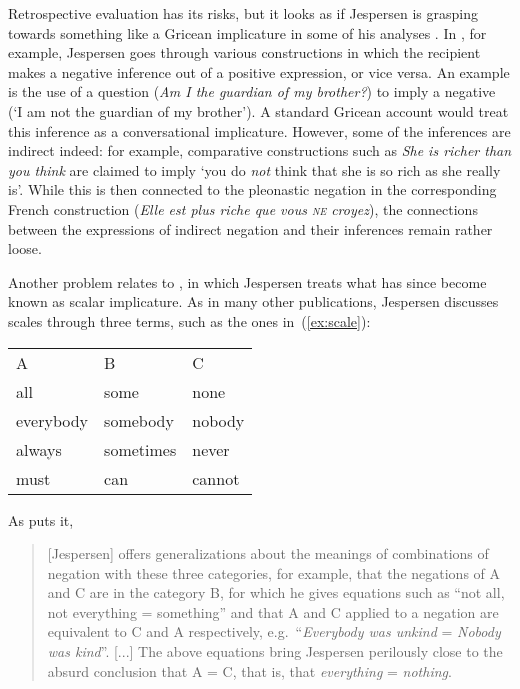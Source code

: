 \documentclass[output=chapter]{langscibook}
\begin{document}
Retrospective evaluation has its risks, but it looks as if Jespersen is grasping towards something like a Gricean implicature in some of his analyses \citep[cf.][]{Grice1975,Horn1989}. In , for example, Jespersen goes through various constructions in which the recipient makes a negative inference out of a positive expression, or vice versa. An example is the use of a question (\textit{Am I the guardian of my brother?}) to imply a negative (`I am not the guardian of my brother’). A standard Gricean account would treat this inference as a conversational implicature. However, some of the inferences are indirect indeed: for example, comparative constructions such as \textit{She is richer than you think} are claimed to imply `you do \textit{not} think that she is so rich as she really is’. While this is then connected to the pleonastic negation in the corresponding French construction (\textit{Elle est plus riche que vous \textsc{ne} croyez}), the connections between the expressions of indirect negation and their inferences remain rather loose.

Another problem relates to , in which Jespersen treats what has since become known as scalar implicature. As in many other publications, Jespersen discusses scales through three terms, such as the ones in~(\ref{ex:scale}):

\ea\label{ex:scale}
\begin{tabular}[t]{lll}
A & B & C \\
all & some & none \\
everybody & somebody & nobody \\
always & sometimes & never \\
must & can & cannot
\end{tabular}
\z

As \citet[35]{McCawley1995} puts it,

\begin{quote}
[Jespersen] offers generalizations about the meanings of combinations of negation with these three categories, for example, that the negations of A and C are in the category B, for which he gives equations such as ``not all, not everything = something'' and that A and C applied to a negation are equivalent to C and A respectively, e.g.\ ``\textit{Everybody was unkind} = \textit{Nobody was kind}''. [...] The above equations bring Jespersen perilously close to the absurd conclusion that A = C, that is, that \textit{everything} = \textit{nothing}.
\end{quote}
\end{document}
